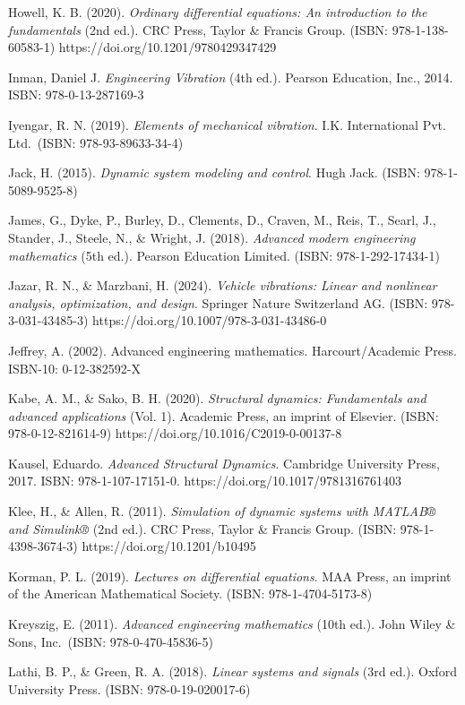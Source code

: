 \documentclass[
  11pt,
]{article}
\begin{document}
Howell, K. B. (2020). \emph{Ordinary differential equations: An
introduction to the fundamentals} (2nd ed.). CRC Press, Taylor \&
Francis Group. (ISBN: 978-1-138-60583-1)
https://doi.org/10.1201/9780429347429

Inman, Daniel J. \emph{Engineering Vibration} (4th ed.). Pearson
Education, Inc., 2014. ISBN: 978-0-13-287169-3

Iyengar, R. N. (2019). \emph{Elements of mechanical vibration}. I.K.
International Pvt. Ltd.~(ISBN: 978-93-89633-34-4)

Jack, H. (2015). \emph{Dynamic system modeling and control}. Hugh Jack.
(ISBN: 978-1-5089-9525-8)

James, G., Dyke, P., Burley, D., Clements, D., Craven, M., Reis, T.,
Searl, J., Stander, J., Steele, N., \& Wright, J. (2018). \emph{Advanced
modern engineering mathematics} (5th ed.). Pearson Education Limited.
(ISBN: 978-1-292-17434-1)

Jazar, R. N., \& Marzbani, H. (2024). \emph{Vehicle vibrations: Linear
and nonlinear analysis, optimization, and design}. Springer Nature
Switzerland AG. (ISBN: 978-3-031-43485-3)
https://doi.org/10.1007/978-3-031-43486-0

Jeffrey, A. (2002). Advanced engineering mathematics. Harcourt/Academic
Press. ISBN-10: 0-12-382592-X

Kabe, A. M., \& Sako, B. H. (2020). \emph{Structural dynamics:
Fundamentals and advanced applications} (Vol. 1). Academic Press, an
imprint of Elsevier. (ISBN: 978-0-12-821614-9)
https://doi.org/10.1016/C2019-0-00137-8

Kausel, Eduardo. \emph{Advanced Structural Dynamics}. Cambridge
University Press, 2017. ISBN: 978-1-107-17151-0.
https://doi.org/10.1017/9781316761403

Klee, H., \& Allen, R. (2011). \emph{Simulation of dynamic systems with
MATLAB® and Simulink®} (2nd ed.). CRC Press, Taylor \& Francis Group.
(ISBN: 978-1-4398-3674-3) https://doi.org/10.1201/b10495

Korman, P. L. (2019). \emph{Lectures on differential equations}. MAA
Press, an imprint of the American Mathematical Society. (ISBN:
978-1-4704-5173-8)

Kreyszig, E. (2011). \emph{Advanced engineering mathematics} (10th ed.).
John Wiley \& Sons, Inc.~(ISBN: 978-0-470-45836-5)

Lathi, B. P., \& Green, R. A. (2018). \emph{Linear systems and signals}
(3rd ed.). Oxford University Press. (ISBN: 978-0-19-020017-6)
\end{document}
